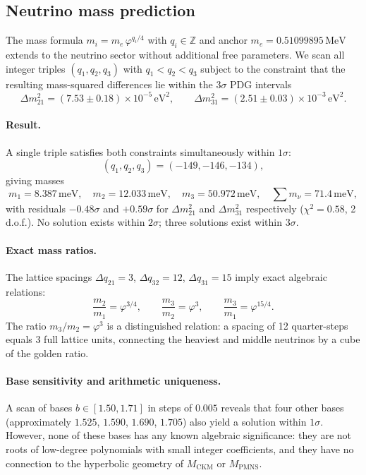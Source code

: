 \documentclass[12pt]{article}
\theoremstyle{definition}
\begin{document}
\subsection{Neutrino mass prediction}
\label{subsec:neutrino}

The mass formula $m_i = m_e\,\varphi^{q_i/4}$ with $q_i\in\mathbb{Z}$
and anchor $m_e = 0.51099895\,\text{MeV}$ extends to the neutrino sector
without additional free parameters.  We scan all integer triples
$(q_1,q_2,q_3)$ with $q_1<q_2<q_3$ subject to the constraint that the
resulting mass-squared differences lie within the $3\sigma$ PDG
intervals~\cite{PDG2024}
\begin{equation}
\Delta m^2_{21} = (7.53\pm0.18)\times10^{-5}\,\text{eV}^2, \qquad
\Delta m^2_{31} = (2.51\pm0.03)\times10^{-3}\,\text{eV}^2.
\end{equation}

\paragraph{Result.}
A single triple satisfies both constraints simultaneously within
$1\sigma$:
\begin{equation}
(q_1,q_2,q_3) = (-149,-146,-134),
\end{equation}
giving masses
\begin{equation}
m_1 = 8.387\,\text{meV},\quad
m_2 = 12.033\,\text{meV},\quad
m_3 = 50.972\,\text{meV},\quad
\sum m_\nu = 71.4\,\text{meV},
\end{equation}
with residuals $-0.48\sigma$ and $+0.59\sigma$ for $\Delta m^2_{21}$
and $\Delta m^2_{31}$ respectively ($\chi^2 = 0.58$, 2\,d.o.f.).
No solution exists within $2\sigma$; three solutions exist within
$3\sigma$.

\paragraph{Exact mass ratios.}
The lattice spacings $\Delta q_{21}=3$, $\Delta q_{32}=12$,
$\Delta q_{31}=15$ imply exact algebraic relations:
\begin{equation}
\frac{m_2}{m_1} = \varphi^{3/4},\qquad
\frac{m_3}{m_2} = \varphi^{3},\qquad
\frac{m_3}{m_1} = \varphi^{15/4}.
\end{equation}
The ratio $m_3/m_2 = \varphi^3$ is a distinguished relation: a spacing
of 12 quarter-steps equals 3 full lattice units, connecting the heaviest
and middle neutrinos by a cube of the golden ratio.

\paragraph{Base sensitivity and arithmetic uniqueness.}
A scan of bases $b\in[1.50,1.71]$ in steps of $0.005$ reveals that
four other bases (approximately $1.525$, $1.590$, $1.690$, $1.705$)
also yield a solution within $1\sigma$.  However, none of these bases
has any known algebraic significance: they are not roots of low-degree
polynomials with small integer coefficients, and they have no connection
to the hyperbolic geometry of $M_\text{CKM}$ or $M_\text{PMNS}$.
\end{document}
